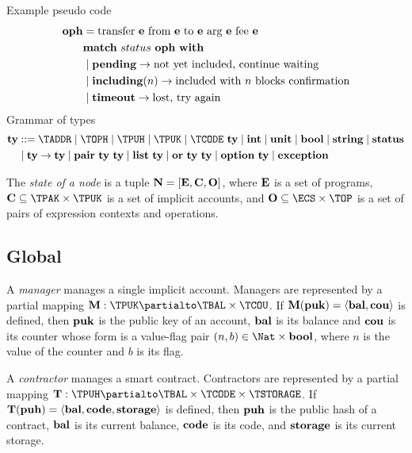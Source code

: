 \documentclass[a4paper]{llncs}
\begin{document}
Example pseudo code
\begin{align*}
  \OPH &=  \TRANSFER[\EXPR]\EXPR\EXPR\EXPR\EXPR \\
       & \MATCH\ {status\ \OPH}\ \WITH \\
       & \mid \STATUSPENDING \to \textrm{not yet included, continue waiting} \\
       & \mid \STATUSINCLUDING (n) \to \textrm{included with $n$
         blocks confirmation}\\
       & \mid \STATUSTIMEOUT \to \textrm{lost, try again}
\end{align*}
Grammar of types
\begin{align*}
  \TYPE & ::= \TADDR \mid \TOPH \mid \TPUH \mid \TPUK \mid \TCODE\ \TYPE \mid
          \TINT \mid \TUNIT \mid \TBOOL \mid \TSTRING \mid \TSTATUS \\
  & \mid \TYPE\to\TYPE \mid \TPAIR\ \TYPE\ \TYPE \mid \TLIST\ \TYPE
    \mid \TSUM\ \TYPE\ \TYPE \mid \TOPTION\ \TYPE \mid \TEXCEPTION
\end{align*}

\begin{definition}%
  The \emph{state of a node} is a tuple
  $\NODE = [ \EXPRS, \ACCOUNTS, \OPERATIONS]$, where $\EXPRS$ is a
  set of programs, $\ACCOUNTS \subseteq \TPAK \times \TPUK$  is a set of
  implicit accounts, and
  $\OPERATIONS \subseteq \ECS \times \TOP $ is a set of pairs of
  expression contexts and operations.
\end{definition}


\subsection{Global}
\label{sec:global}



\begin{definition}%
A \emph{manager} manages a single implicit account. Managers are
represented by a partial mapping $\MANAGERS : \TPUK \partialto \TBAL
\times \TCOU$. If $\MANAGERS (\PUK) = \Angle{\BAL, \COU}$ is defined, then  $\PUK$ is the
public key of an account, $\BAL$ is its
balance and $\COU$ is its counter whose form is a value-flag pair
$(n,b) \in \Nat\times\TBOOL$, where $n$ is the value of the counter
and ${b}$ is its flag.   
\end{definition}

\begin{definition}%
  A \emph{contractor} manages a smart contract. Contractors are
  represented by a partial mapping $\CONTRACTORS : \TPUH \partialto
  \TBAL \times \TCODE \times \TSTORAGE$. If $\CONTRACTORS (\PUH) = \langle
  \BAL, \CODE, \STORAGE \rangle $ is defined, then $\PUH$ is the
  public hash of a contract, $\BAL$ is its current balance, $\CODE$ is its
  code, and $\STORAGE$ is its current storage.
\end{definition}
\end{document}
